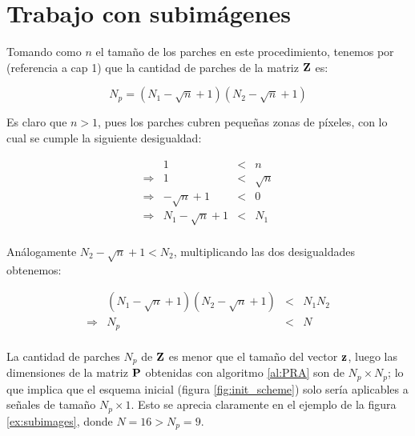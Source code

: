 \section{Trabajo con subim\'agenes}
Tomando como $n$ el tamaño de los parches en este procedimiento, tenemos por (referencia a cap 1) que la cantidad de parches de la matriz $\Z$ es: 

\begin{equation}
	N_p = (N_1 - \sqrt{n} + 1)(N_2 - \sqrt{n} + 1)
	\label{eq:patches}
\end{equation}

Es claro que $n > 1$, pues los parches cubren pequeñas zonas de p\'ixeles, con lo cual se cumple la siguiente desigualdad:

\begin{equation}
	\begin{array}{lrcl}
		                &                 1 &<& n        \\ 
		\Longrightarrow &                 1 &<& \sqrt{n} \\
		\Longrightarrow &     -\sqrt{n} + 1 &<& 0        \\
		\Longrightarrow & N_1 -\sqrt{n} + 1 &<& N_1      \\
	\end{array}
\end{equation}

An\'alogamente $N_2 -\sqrt{n} + 1 < N_2$, multiplicando las dos desigualdades obtenemos:

\begin{equation}
	\begin{array}{lrcl}
		                & (N_1 - \sqrt{n} + 1)(N_2 - \sqrt{n} + 1) &<& N_1N_2 \\ 
		\Longrightarrow &                                      N_p &<& N      \\
	\end{array}
	\label{eq:patches_ineq}
\end{equation}

La cantidad de parches $N_p$ de $\Z$ es menor que el tamaño del vector $\z$, luego las dimensiones de la matriz $\P$ obtenidas con algoritmo \ref{al:PRA} son de $N_p \times N_p$; lo que implica que el esquema inicial (figura \ref{fig:init_scheme}) solo ser\'ia aplicables a señales de tamaño $N_p \times 1$. Esto se aprecia claramente en el ejemplo de la figura \ref{ex:subimages}, donde $N = 16 > N_p = 9$.


